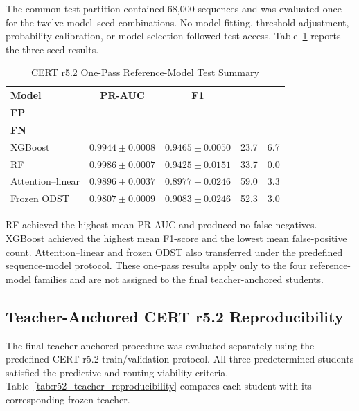 \smallskip
The common test partition contained 68,000 sequences and was evaluated once
for the twelve model--seed combinations. No model fitting, threshold
adjustment, probability calibration, or model selection followed test
access. Table~\ref{tab:r52_test_summary} reports the three-seed results.

\begin{table}[!tbp]
\caption{CERT r5.2 One-Pass Reference-Model Test Summary}
\label{tab:r52_test_summary}
\centering
\footnotesize
\renewcommand{\arraystretch}{1.08}
\setlength{\tabcolsep}{0pt}
\begin{tabular*}{\columnwidth}
{@{\extracolsep{\fill}}lcccc@{}}
\hline
\textbf{Model} &
\textbf{PR-AUC} &
\textbf{F1} &
\shortstack{\textbf{Mean}\\\textbf{FP}} &
\shortstack{\textbf{Mean}\\\textbf{FN}} \\
\hline
XGBoost &
\(0.9944\pm0.0008\) &
\(0.9465\pm0.0050\) &
23.7 &
6.7 \\
RF &
\(0.9986\pm0.0007\) &
\(0.9425\pm0.0151\) &
33.7 &
0.0 \\
Attention--linear &
\(0.9896\pm0.0037\) &
\(0.8977\pm0.0246\) &
59.0 &
3.3 \\
Frozen ODST &
\(0.9807\pm0.0009\) &
\(0.9083\pm0.0246\) &
52.3 &
3.0 \\
\hline
\end{tabular*}
\end{table}

RF achieved the highest mean PR-AUC and produced no false negatives.
XGBoost achieved the highest mean F1-score and the lowest mean
false-positive count. Attention--linear and frozen ODST also transferred
under the predefined sequence-model protocol. These one-pass results apply
only to the four reference-model families and are not assigned to the final
teacher-anchored students.

\subsection{Teacher-Anchored CERT r5.2 Reproducibility}
\label{subsec:r52_teacher_anchored_results}
The final teacher-anchored procedure was evaluated separately using the
predefined CERT r5.2 train/validation protocol. All three predetermined
students satisfied the predictive and routing-viability criteria.
Table~\ref{tab:r52_teacher_reproducibility} compares each student with its
corresponding frozen teacher.

